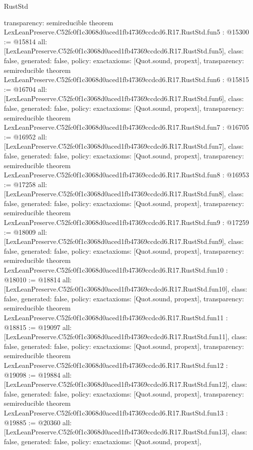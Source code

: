 \begin{lexlean}{RustStd}
\begin{coremodule}
{  transparency: semireducible
}
theorem LexLeanPreserve.C52fc0f1c3068d0aced1fb47369ccdcd6.R17.RustStd.fun5 : @15300 := @15814 {
  all: [LexLeanPreserve.C52fc0f1c3068d0aced1fb47369ccdcd6.R17.RustStd.fun5],
  class: false,
  generated: false,
  policy: exact{axioms: [Quot.sound, propext]},
  transparency: semireducible
}
theorem LexLeanPreserve.C52fc0f1c3068d0aced1fb47369ccdcd6.R17.RustStd.fun6 : @15815 := @16704 {
  all: [LexLeanPreserve.C52fc0f1c3068d0aced1fb47369ccdcd6.R17.RustStd.fun6],
  class: false,
  generated: false,
  policy: exact{axioms: [Quot.sound, propext]},
  transparency: semireducible
}
theorem LexLeanPreserve.C52fc0f1c3068d0aced1fb47369ccdcd6.R17.RustStd.fun7 : @16705 := @16952 {
  all: [LexLeanPreserve.C52fc0f1c3068d0aced1fb47369ccdcd6.R17.RustStd.fun7],
  class: false,
  generated: false,
  policy: exact{axioms: [Quot.sound, propext]},
  transparency: semireducible
}
theorem LexLeanPreserve.C52fc0f1c3068d0aced1fb47369ccdcd6.R17.RustStd.fun8 : @16953 := @17258 {
  all: [LexLeanPreserve.C52fc0f1c3068d0aced1fb47369ccdcd6.R17.RustStd.fun8],
  class: false,
  generated: false,
  policy: exact{axioms: [Quot.sound, propext]},
  transparency: semireducible
}
theorem LexLeanPreserve.C52fc0f1c3068d0aced1fb47369ccdcd6.R17.RustStd.fun9 : @17259 := @18009 {
  all: [LexLeanPreserve.C52fc0f1c3068d0aced1fb47369ccdcd6.R17.RustStd.fun9],
  class: false,
  generated: false,
  policy: exact{axioms: [Quot.sound, propext]},
  transparency: semireducible
}
theorem LexLeanPreserve.C52fc0f1c3068d0aced1fb47369ccdcd6.R17.RustStd.fun10 : @18010 := @18814 {
  all: [LexLeanPreserve.C52fc0f1c3068d0aced1fb47369ccdcd6.R17.RustStd.fun10],
  class: false,
  generated: false,
  policy: exact{axioms: [Quot.sound, propext]},
  transparency: semireducible
}
theorem LexLeanPreserve.C52fc0f1c3068d0aced1fb47369ccdcd6.R17.RustStd.fun11 : @18815 := @19097 {
  all: [LexLeanPreserve.C52fc0f1c3068d0aced1fb47369ccdcd6.R17.RustStd.fun11],
  class: false,
  generated: false,
  policy: exact{axioms: [Quot.sound, propext]},
  transparency: semireducible
}
theorem LexLeanPreserve.C52fc0f1c3068d0aced1fb47369ccdcd6.R17.RustStd.fun12 : @19098 := @19884 {
  all: [LexLeanPreserve.C52fc0f1c3068d0aced1fb47369ccdcd6.R17.RustStd.fun12],
  class: false,
  generated: false,
  policy: exact{axioms: [Quot.sound, propext]},
  transparency: semireducible
}
theorem LexLeanPreserve.C52fc0f1c3068d0aced1fb47369ccdcd6.R17.RustStd.fun13 : @19885 := @20360 {
  all: [LexLeanPreserve.C52fc0f1c3068d0aced1fb47369ccdcd6.R17.RustStd.fun13],
  class: false,
  generated: false,
  policy: exact{axioms: [Quot.sound, propext]},
}
\end{coremodule}
\end{lexlean}
